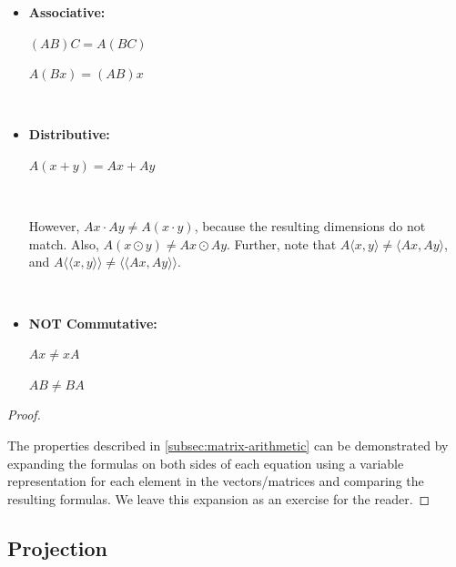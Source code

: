 \begin{tcolorbox}[title={\textbf{\tboxtheorem{\ref*{subsec:matrix-arithmetic}} Matrix Arithmetic Properties}}]

\begin{itemize}

\item \textbf{Associative:} 

$(AB)C = A(BC)$

$A(Bx) = (AB)x$


$ $

 
\item \textbf{Distributive:} 

$A(x + y) = Ax + Ay$




$ $

However, $Ax \cdot Ay \neq A(x \cdot y)$, because the resulting dimensions do not match. Also, $A(x \odot y) \neq Ax \odot Ay $. Further, note that $A\langle x, y\rangle \neq \langle Ax, Ay\rangle$, and $A\langle \langle x, y\rangle\rangle \neq \langle\langle Ax, Ay\rangle\rangle$.

$ $

\item \textbf{NOT Commutative:} 

$Ax \neq xA$

$AB \neq BA$


\end{itemize}
\end{tcolorbox}

\begin{proof}

$ $

The properties described in \ref*{subsec:matrix-arithmetic} can be demonstrated by expanding the formulas on both sides of each equation using a variable representation for each element in the vectors/matrices and comparing the resulting formulas. We leave this expansion as an exercise for the reader.

\end{proof}


\subsection{Projection}
\label{subsec:projection}

